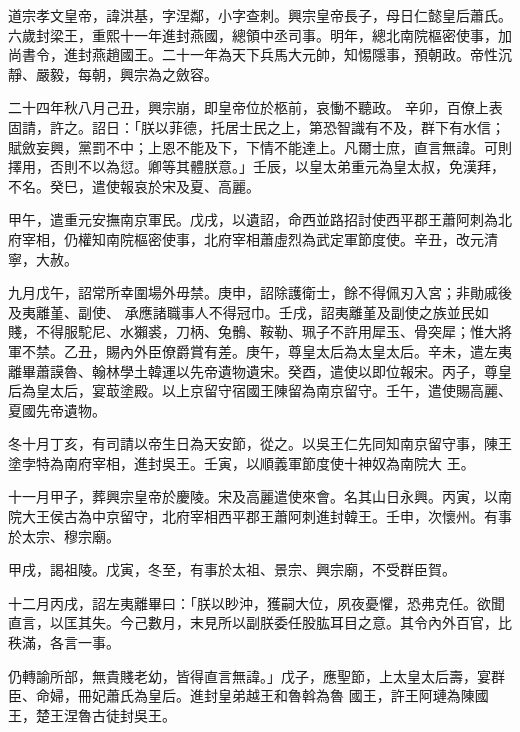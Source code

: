 
\begin{pinyinscope}

 道宗孝文皇帝，諱洪基，字涅鄰，小字查刺。興宗皇帝長子，母日仁懿皇后蕭氏。六歲封梁王，重熙十一年進封燕國，總領中丞司事。明年，總北南院樞密使事，加尚書令，進封燕趙國王。二十一年為天下兵馬大元帥，知惕隱事，預朝政。帝性沉靜、嚴毅，每朝，興宗為之斂容。



 二十四年秋八月己丑，興宗崩，即皇帝位於柩前，哀慟不聽政。
 辛卯，百僚上表固請，許之。詔日：「朕以菲德，托居士民之上，第恐智識有不及，群下有水信；賦斂妄興，黨罰不中；上恩不能及下，下情不能達上。凡爾士庶，直言無諱。可則擇用，否則不以為愆。卿等其體朕意。」壬辰，以皇太弟重元為皇太叔，免漢拜，不名。癸巳，遣使報哀於宋及夏、高麗。



 甲午，遣重元安撫南京軍民。戊戌，以遺詔，命西並路招討使西平郡王蕭阿刺為北府宰相，仍權知南院樞密使事，北府宰相蕭虛烈為武定軍節度使。辛丑，改元清寧，大赦。



 九月戊午，詔常所幸圍場外毋禁。庚申，詔除護衛士，餘不得佩刃入宮；非勛戚後及夷離堇、副使、
 承應諸職事人不得冠巾。壬戌，詔夷離堇及副使之族並民如賤，不得服駝尼、水獺裘，刀柄、兔鶻、鞍勒、珮子不許用犀玉、骨突犀；惟大將軍不禁。乙丑，賜內外臣僚爵賞有差。庚午，尊皇太后為太皇太后。辛未，遣左夷離畢蕭謨魯、翰林學土韓運以先帝遺物遺宋。癸酉，遣使以即位報宋。丙子，尊皇后為皇太后，宴菆塗殿。以上京留守宿國王陳留為南京留守。壬午，遣使賜高麗、夏國先帝遺物。



 冬十月丁亥，有司請以帝生日為天安節，從之。以吳王仁先同知南京留守事，陳王塗孛特為南府宰相，進封吳王。壬寅，以順義軍節度使十神奴為南院大
 王。



 十一月甲子，葬興宗皇帝於慶陵。宋及高麗遣使來會。名其山日永興。丙寅，以南院大王侯古為中京留守，北府宰相西平郡王蕭阿刺進封韓王。壬申，次懷州。有事於太宗、穆宗廟。



 甲戌，謁祖陵。戊寅，冬至，有事於太祖、景宗、興宗廟，不受群臣賀。



 十二月丙戌，詔左夷離畢曰：「朕以眇沖，獲嗣大位，夙夜憂懼，恐弗克任。欲聞直言，以匡其失。今己數月，末見所以副朕委任股肱耳目之意。其令內外百官，比秩滿，各言一事。



 仍轉諭所部，無貴賤老幼，皆得直言無諱。」戊子，應聖節，上太皇太后壽，宴群臣、命婦，冊妃蕭氏為皇后。進封皇弟越王和魯斡為魯
 國王，許王阿璉為陳國王，楚王涅魯古徒封吳王。




\end{pinyinscope}

